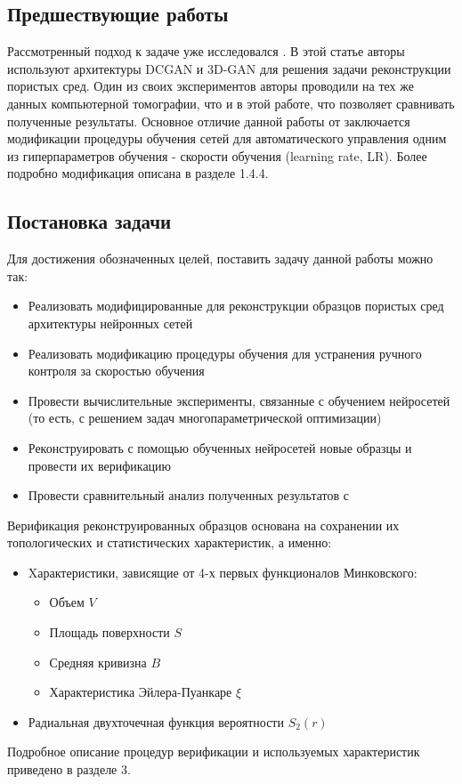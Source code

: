 	\subsection*{Предшествующие работы}
		Рассмотренный подход к задаче уже исследовался \cite{Mosser}. В этой статье авторы используют архитектуры DCGAN \cite{Radford} и 3D-GAN \cite{Wu} для решения задачи реконструкции пористых сред. Один из своих экспериментов авторы проводили на тех же данных компьютерной томографии, что и в этой работе, что позволяет сравнивать полученные результаты. Основное отличие данной работы от \cite{Mosser} заключается модификации процедуры обучения сетей для автоматического управления одним из гиперпараметров обучения - скорости обучения (learning rate, LR). Более подробно модификация описана в разделе 1.4.4.
	
	\subsection*{Постановка задачи}
	
	Для достижения обозначенных целей, поставить задачу данной работы можно так:
	
	\begin{itemize}
		\item Реализовать модифицированные для реконструкции образцов пористых сред архитектуры нейронных сетей
		\item Реализовать модификацию процедуры обучения для устранения ручного контроля за скоростью обучения
		\item Провести вычислительные эксперименты, связанные с обучением нейросетей (то есть, с решением задач многопараметрической оптимизации)
		\item Реконструировать с помощью обученных нейросетей новые образцы и провести их верификацию
		\item Провести сравнительный анализ полученных результатов с \cite{Mosser}
	\end{itemize}

	Верификация реконструированных образцов основана на сохранении их топологических и статистических характеристик, а именно:
	
	\begin{itemize}
		\item Xарактеристики, зависящие от 4-х первых функционалов Минковского:
		\begin{itemize}
			\item Объем $V$
			\item Площадь поверхности $S$
			\item Средняя кривизна $B$
			\item Характеристика Эйлера-Пуанкаре $\xi$
		\end{itemize}
		\item Радиальная двухточечная функция вероятности $S_2(r)$
	\end{itemize}

	Подробное описание процедур верификации и используемых характеристик приведено в разделе 3.
